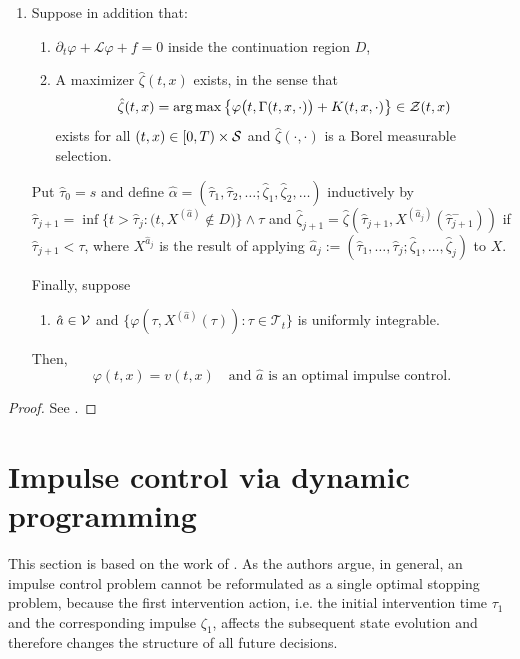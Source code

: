 \begin{theorem}
\begin{enumerate}[label=(\alph*)]
        \item Suppose in addition that:
        \begin{enumerate}[label=(\roman*), start=10]
            \item $\partial_t \varphi + \mathcal{L}\varphi + f = 0$ inside the continuation region $D$,
            \item A maximizer $\hat{\zeta}(t,x)$ exists, in the sense that
            \begin{equation*}
                \hat{\zeta}(t,x) = \operatorname*{arg\,max} \big\{\varphi\big(t, \Gamma(t,x,\cdot)\big) + K(t,x,\cdot) \big\} \in \mathcal{Z}(t,x) 
            \end{equation*}
            exists for all $(t,x) \in [0,T) \times \mathcal{S}$ and $\hat{\zeta}(\cdot, \cdot)$ is a Borel measurable selection.
        \end{enumerate}
        Put $\hat \tau_0 = s$ and define $\hat \alpha= (\hat \tau_1, \hat \tau_2, \ldots; \hat \zeta_1, \hat \zeta_2, \ldots)$ inductively by $\hat \tau_{j+1} = \inf \{ t > \hat \tau_j: \big( t, X^{(\hat a)} \notin D \big) \} \wedge \tau$ and $\hat \zeta_{j+1} = \hat \zeta(\hat \tau_{j+1}, X^{(\hat a_j)}(\hat \tau_{j+1}^-))$ if $\hat \tau_{j+1} < \tau$, where $X^{\hat a_j}$ is the result of applying $\hat a_j:=(\hat \tau_1, \ldots, \hat \tau_j; \hat \zeta_1, \ldots, \hat \zeta_j)$ to $X$. 
        
        Finally, suppose 
        \begin{enumerate}[label=(\roman*), start=12]
            \item $\hat a \in \mathcal{V}$ and $\{\varphi(\tau,X^{(\hat a)}(\tau)): \tau \in \mathcal{T}_t\}$ is uniformly integrable.
        \end{enumerate}
        Then,
        \begin{equation}
            \varphi(t,x) = v(t,x) \quad \text{and } \hat a \text{ is an optimal impulse control}.
            \label{eqn: ØS theorem 9.2, second ineq}
        \end{equation}
    \end{enumerate}
\end{theorem}
\begin{proof}
    See \cite[pp.242-243]{oksendal2007applied}.
\end{proof}


\section{Impulse control via dynamic programming}
\label{section: Dynamic Programming Principle and Related Results}
This section is based on the work of \textcite[Chapter 10.1]{oksendal2007applied}. As the authors argue, in general, an impulse control problem cannot be reformulated as a single optimal stopping problem, because the first intervention action, i.e. the initial intervention time $\tau_1$ and the corresponding impulse $\zeta_1$, affects the subsequent state evolution and therefore changes the structure of all future decisions.

